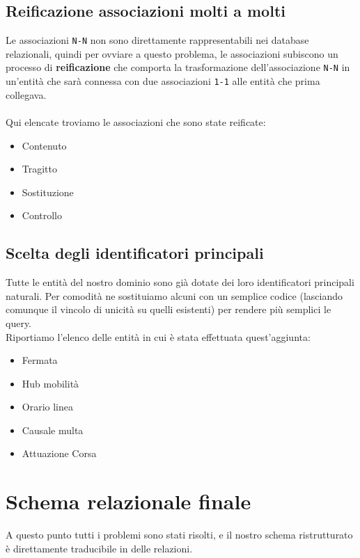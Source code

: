 \documentclass[12pt,a4paper]{report}
\begin{document}
\subsection{Reificazione associazioni molti a molti}
Le associazioni \texttt{N-N} non sono direttamente rappresentabili nei database relazionali, quindi per ovviare a questo problema, le associazioni subiscono un processo di \textbf{reificazione} che comporta la trasformazione dell'associazione \texttt{N-N} in un'entità che sarà connessa con due associazioni \texttt{1-1} alle entità che prima collegava.\\ \\
Qui elencate troviamo le associazioni che sono state reificate:
\begin{itemize}
    \item Contenuto
    \item Tragitto
    \item Sostituzione
    \item Controllo
\end{itemize}

\subsection{Scelta degli identificatori principali}
Tutte le entità del nostro dominio sono già dotate dei loro identificatori principali naturali.
Per comodità ne sostituiamo alcuni con un semplice codice (lasciando comunque il vincolo di unicità su quelli esistenti) per rendere più semplici le query.\\
Riportiamo l'elenco delle entità in cui è stata effettuata quest'aggiunta:
\begin{itemize}
    \item Fermata
    \item Hub mobilità
    \item Orario linea
    \item Causale multa
    \item Attuazione Corsa
\end{itemize}

\section{Schema relazionale finale}
A questo punto tutti i problemi sono stati risolti, e il nostro schema ristrutturato è direttamente traducibile in delle relazioni.
\end{document}
